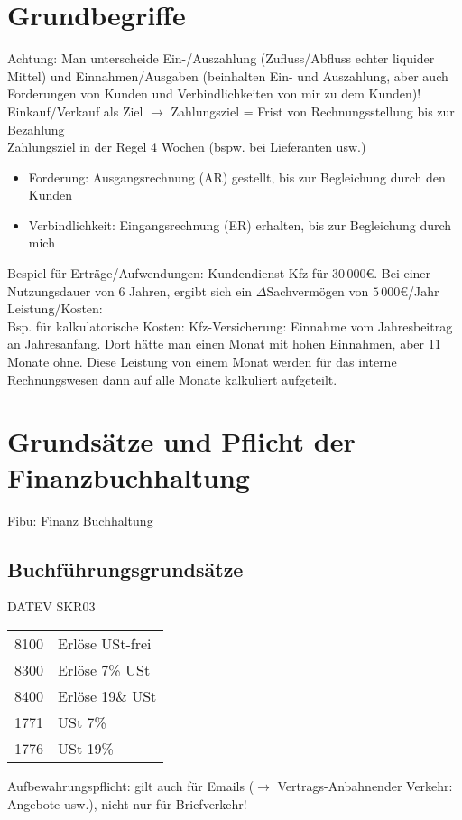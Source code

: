 \documentclass{scrreprt}
\begin{document}
\section{Grundbegriffe}
Achtung: Man unterscheide Ein-/Auszahlung (Zufluss/Abfluss echter liquider Mittel) und Einnahmen/Ausgaben (beinhalten Ein- und Auszahlung, aber auch Forderungen von Kunden und Verbindlichkeiten von mir zu dem Kunden)!\medskip\\
Einkauf/Verkauf als Ziel $\to$ Zahlungsziel = Frist von Rechnungsstellung bis zur Bezahlung\\
Zahlungsziel in der Regel 4 Wochen (bspw. bei Lieferanten usw.)
\begin{itemize}
\item Forderung: Ausgangsrechnung (AR) gestellt, bis zur Begleichung durch den Kunden
\item Verbindlichkeit: Eingangsrechnung (ER) erhalten, bis zur Begleichung durch mich
\end{itemize}
Bespiel für Erträge/Aufwendungen: Kundendienst-Kfz für $30\,000$\euro{}. Bei einer Nutzungsdauer von 6 Jahren, ergibt sich ein $\Delta$Sachvermögen von $5\,000$\euro{}/Jahr\bigskip\\
Leistung/Kosten: \\
Bsp. für kalkulatorische Kosten: Kfz-Versicherung: Einnahme vom Jahresbeitrag an Jahresanfang. Dort hätte man einen Monat mit hohen Einnahmen, aber 11 Monate ohne. Diese Leistung von einem Monat werden für das interne Rechnungswesen dann auf alle Monate kalkuliert aufgeteilt.
\section{Grundsätze und Pflicht der Finanzbuchhaltung}
Fibu: Finanz Buchhaltung
\subsection{Buchführungsgrundsätze}
DATEV SKR03\\
\begin{tabular}{l l}
8100 & Erlöse USt-frei\\
8300 & Erlöse 7\% USt\\
8400 & Erlöse 19\& USt\\
\hline
1771 & USt 7\%\\
1776 & USt 19\%
\end{tabular}
Aufbewahrungspflicht: gilt auch für Emails ($\to$ Vertrags-Anbahnender Verkehr: Angebote usw.), nicht nur für Briefverkehr!
\end{document}
